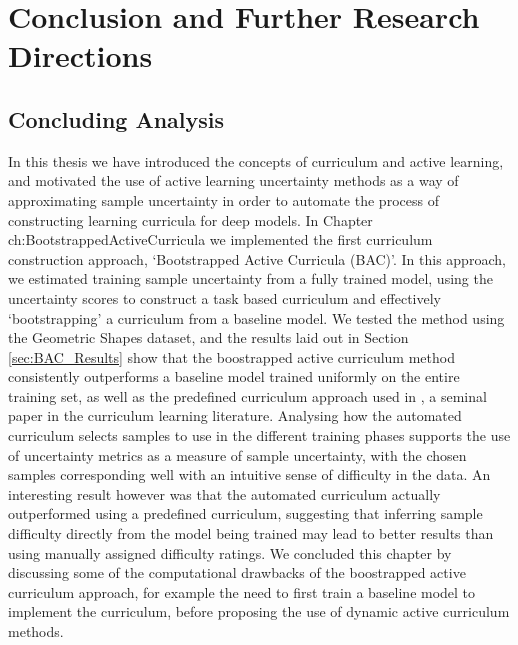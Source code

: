 \chapter{Conclusion and Further Research Directions}
\section{Concluding Analysis}
In this thesis we have introduced the concepts of curriculum and active learning, and motivated the use of active learning uncertainty methods as a way of approximating sample uncertainty in order to automate the process of constructing learning curricula for deep models. In Chapter {ch:BootstrappedActiveCurricula} we implemented the first  curriculum construction approach, `Bootstrapped Active Curricula (BAC)'. In this approach, we estimated training sample uncertainty from a fully trained model, using the uncertainty scores to construct a task based curriculum and effectively `bootstrapping' a curriculum from a baseline model. We tested the method using the Geometric Shapes dataset, and the results laid out in Section \ref{sec:BAC_Results} show that the boostrapped active curriculum method consistently outperforms a baseline model trained uniformly on the entire training set, as well as the predefined curriculum approach used in \cite{Bengio2009}, a seminal paper in the curriculum learning literature. Analysing how the automated curriculum selects samples to use in the different training phases supports the use of uncertainty metrics as a measure of sample uncertainty, with the chosen samples corresponding well with an intuitive sense of difficulty in the data. An interesting result however was that the automated curriculum actually outperformed using a predefined curriculum, suggesting that inferring sample difficulty directly from the model being trained may lead to better results than using manually assigned difficulty ratings. We concluded this chapter by discussing some of the computational drawbacks of the boostrapped active curriculum approach, for example the need to first train a baseline model to implement the curriculum, before proposing the use of dynamic active curriculum methods.

